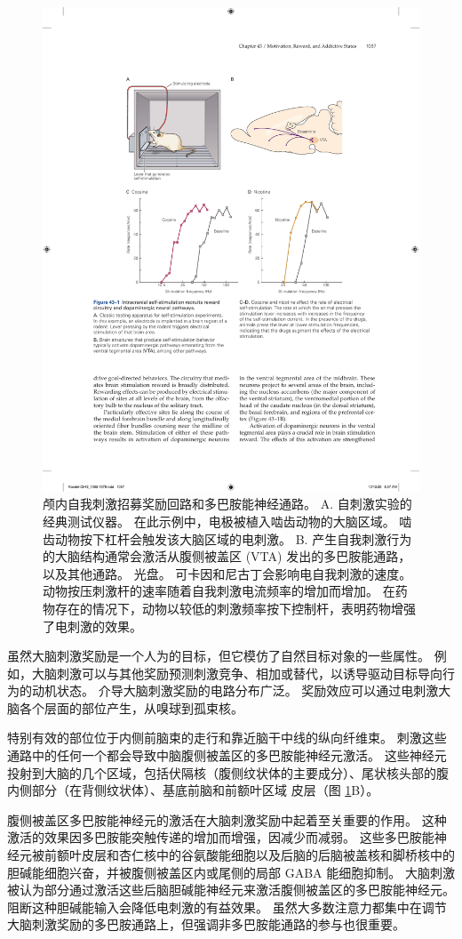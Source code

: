 \begin{figure}[htbp]
	\centering
	\includegraphics[width=0.7\linewidth]{chap43/fig_43_1}
	\caption{颅内自我刺激招募奖励回路和多巴胺能神经通路。 A. 自刺激实验的经典测试仪器。 在此示例中，电极被植入啮齿动物的大脑区域。 啮齿动物按下杠杆会触发该大脑区域的电刺激。 B. 产生自我刺激行为的大脑结构通常会激活从腹侧被盖区 (VTA) 发出的多巴胺能通路，以及其他通路。 光盘。 可卡因和尼古丁会影响电自我刺激的速度。 动物按压刺激杆的速率随着自我刺激电流频率的增加而增加。 在药物存在的情况下，动物以较低的刺激频率按下控制杆，表明药物增强了电刺激的效果。}
	\label{fig:43_1}
\end{figure}

虽然大脑刺激奖励是一个人为的目标，但它模仿了自然目标对象的一些属性。 例如，大脑刺激可以与其他奖励预测刺激竞争、相加或替代，以诱导驱动目标导向行为的动机状态。 介导大脑刺激奖励的电路分布广泛。 奖励效应可以通过电刺激大脑各个层面的部位产生，从嗅球到孤束核。

特别有效的部位位于内侧前脑束的走行和靠近脑干中线的纵向纤维束。 刺激这些通路中的任何一个都会导致中脑腹侧被盖区的多巴胺能神经元激活。 这些神经元投射到大脑的几个区域，包括伏隔核（腹侧纹状体的主要成分）、尾状核头部的腹内侧部分（在背侧纹状体）、基底前脑和前额叶区域 皮层（图 \ref{fig:43_1}B）。

腹侧被盖区多巴胺能神经元的激活在大脑刺激奖励中起着至关重要的作用。 这种激活的效果因多巴胺能突触传递的增加而增强，因减少而减弱。 这些多巴胺能神经元被前额叶皮层和杏仁核中的谷氨酸能细胞以及后脑的后脑被盖核和脚桥核中的胆碱能细胞兴奋，并被腹侧被盖区内或尾侧的局部 GABA 能细胞抑制。 大脑刺激被认为部分通过激活这些后脑胆碱能神经元来激活腹侧被盖区的多巴胺能神经元。 阻断这种胆碱能输入会降低电刺激的有益效果。 虽然大多数注意力都集中在调节大脑刺激奖励的多巴胺通路上，但强调非多巴胺能通路的参与也很重要。

